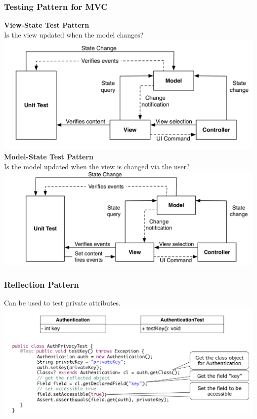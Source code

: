 \subsubsection{Testing Pattern for MVC}
\textbf{View-State Test Pattern}\\
Is the view updated when the model changes?\\
\includegraphics[width=\linewidth]{images/testing_pattern_mvc_view_state.png}
\textbf{Model-State Test Pattern}\\
Is the model updated when the view is changed via the user?\\
\includegraphics[width=\linewidth]{images/testing_pattern_mvc_model_state.png}
\newpage

\subsubsection{Reflection Pattern}
Can be used to test private attributes.\\
\includegraphics[width=\linewidth]{images/testing_pattern_reflection.png}
\newpage
